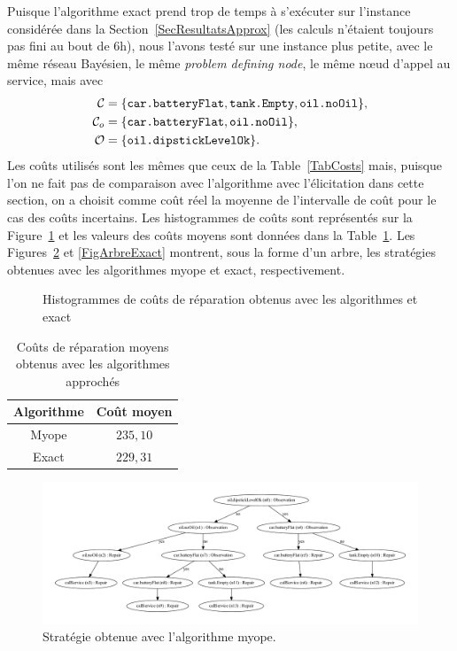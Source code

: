 \documentclass[a4paper,11pt]{article}
\theoremstyle{plain}
\theoremstyle{definition}
\begin{document}
Puisque l'algorithme exact prend trop de temps à s'exécuter sur l'instance considérée dans la Section~\ref{SecResultatsApprox} (les calculs n'étaient toujours pas fini au bout de 6h), nous l'avons testé sur une instance plus petite, avec le même réseau Bayésien, le même \emph{problem defining node}, le même nœud d'appel au service, mais avec
\begin{align*}
\mathcal C & = \{\text{\texttt{car.batteryFlat}}, \text{\texttt{tank.Empty}}, \text{\texttt{oil.noOil}}\}, \\
\mathcal C_o & = \{\text{\texttt{car.batteryFlat}}, \text{\texttt{oil.noOil}}\}, \\
\mathcal O & = \{\text{\texttt{oil.dipstickLevelOk}}\}.
\end{align*}
Les coûts utilisés sont les mêmes que ceux de la Table~\ref{TabCosts} mais, puisque l'on ne fait pas de comparaison avec l'algorithme avec l'élicitation dans cette section, on a choisit comme coût réel la moyenne de l'intervalle de coût pour le cas des coûts incertains. Les histogrammes de coûts sont représentés sur la Figure~\ref{FigHistoExact} et les valeurs des coûts moyens sont données dans la Table~\ref{TabECsExact}. Les Figures~\ref{FigArbreMyope} et \ref{FigArbreExact} montrent, sous la forme d'un arbre, les stratégies obtenues avec les algorithmes myope et exact, respectivement.

\begin{figure}[ht]
\centering
\resizebox{\textwidth}{!}{}
\caption{Histogrammes de coûts de réparation obtenus avec les algorithmes et exact}
\label{FigHistoExact}
\end{figure}

\begin{table}[ht]
\centering
\caption{Coûts de réparation moyens obtenus avec les algorithmes approchés}
\label{TabECsExact}
\begin{tabular}{cc}
\toprule
Algorithme & Coût moyen \tabularnewline
\midrule
Myope & $235,10$ \tabularnewline
Exact & $229,31$ \tabularnewline
\bottomrule
\end{tabular}
\end{table}

\begin{figure}[ht]
\centering
\includegraphics[width=\textwidth]{Figures/myopic.pdf}
\caption{Stratégie obtenue avec l'algorithme myope.}
\label{FigArbreMyope}
\end{figure}
\end{document}

